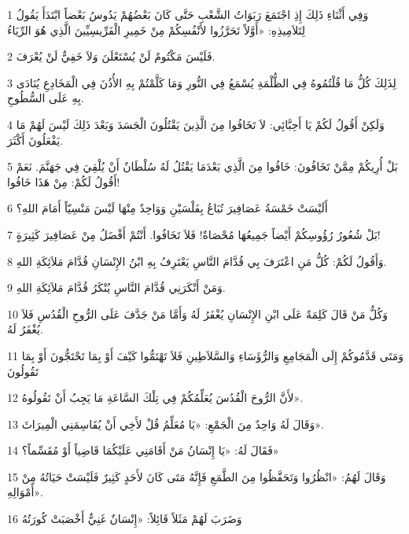 \par 1 وَفِي أَثْنَاءِ ذَلِكَ إِذِ اجْتَمَعَ رَبَوَاتُ الشَّعْبِ حَتَّى كَانَ بَعْضُهُمْ يَدُوسُ بَعْضاً ابْتَدَأَ يَقُولُ لِتَلاَمِيذِهِ: «أَوَّلاً تَحَرَّزُوا لأَنْفُسِكُمْ مِنْ خَمِيرِ الْفَرِّيسِيِّينَ الَّذِي هُوَ الرِّيَاءُ
\par 2 فَلَيْسَ مَكْتُومٌ لَنْ يُسْتَعْلَنَ وَلاَ خَفِيٌّ لَنْ يُعْرَفَ.
\par 3 لِذَلِكَ كُلُّ مَا قُلْتُمُوهُ فِي الظُّلْمَةِ يُسْمَعُ فِي النُّورِ وَمَا كَلَّمْتُمْ بِهِ الأُذُنَ فِي الْمَخَادِعِ يُنَادَى بِهِ عَلَى السُّطُوحِ.
\par 4 وَلَكِنْ أَقُولُ لَكُمْ يَا أَحِبَّائِي: لاَ تَخَافُوا مِنَ الَّذِينَ يَقْتُلُونَ الْجَسَدَ وَبَعْدَ ذَلِكَ لَيْسَ لَهُمْ مَا يَفْعَلُونَ أَكْثَرَ.
\par 5 بَلْ أُرِيكُمْ مِمَّنْ تَخَافُونَ: خَافُوا مِنَ الَّذِي بَعْدَمَا يَقْتُلُ لَهُ سُلْطَانٌ أَنْ يُلْقِيَ فِي جَهَنَّمَ. نَعَمْ أَقُولُ لَكُمْ: مِنْ هَذَا خَافُوا!
\par 6 أَلَيْسَتْ خَمْسَةُ عَصَافِيرَ تُبَاعُ بِفَلْسَيْنِ وَوَاحِدٌ مِنْهَا لَيْسَ مَنْسِيّاً أَمَامَ اللهِ؟
\par 7 بَلْ شُعُورُ رُؤُوسِكُمْ أَيْضاً جَمِيعُهَا مُحْصَاةٌ! فَلاَ تَخَافُوا. أَنْتُمْ أَفْضَلُ مِنْ عَصَافِيرَ كَثِيرَةٍ!
\par 8 وَأَقُولُ لَكُمْ: كُلُّ مَنِ اعْتَرَفَ بِي قُدَّامَ النَّاسِ يَعْتَرِفُ بِهِ ابْنُ الإِنْسَانِ قُدَّامَ مَلاَئِكَةِ اللهِ.
\par 9 وَمَنْ أَنْكَرَنِي قُدَّامَ النَّاسِ يُنْكَرُ قُدَّامَ مَلاَئِكَةِ اللهِ.
\par 10 وَكُلُّ مَنْ قَالَ كَلِمَةً عَلَى ابْنِ الإِنْسَانِ يُغْفَرُ لَهُ وَأَمَّا مَنْ جَدَّفَ عَلَى الرُّوحِ الْقُدُسِ فَلاَ يُغْفَرُ لَهُ.
\par 11 وَمَتَى قَدَّمُوكُمْ إِلَى الْمَجَامِعِ وَالرُّؤَسَاءِ وَالسَّلاَطِينِ فَلاَ تَهْتَمُّوا كَيْفَ أَوْ بِمَا تَحْتَجُّونَ أَوْ بِمَا تَقُولُونَ
\par 12 لأَنَّ الرُّوحَ الْقُدُسَ يُعَلِّمُكُمْ فِي تِلْكَ السَّاعَةِ مَا يَجِبُ أَنْ تَقُولُوهُ».
\par 13 وَقَالَ لَهُ وَاحِدٌ مِنَ الْجَمْعِ: «يَا مُعَلِّمُ قُلْ لأَخِي أَنْ يُقَاسِمَنِي الْمِيرَاثَ».
\par 14 فَقَالَ لَهُ: «يَا إِنْسَانُ مَنْ أَقَامَنِي عَلَيْكُمَا قَاضِياً أَوْ مُقَسِّماً؟»
\par 15 وَقَالَ لَهُمُ: «انْظُرُوا وَتَحَفَّظُوا مِنَ الطَّمَعِ فَإِنَّهُ مَتَى كَانَ لأَحَدٍ كَثِيرٌ فَلَيْسَتْ حَيَاتُهُ مِنْ أَمْوَالِهِ».
\par 16 وَضَرَبَ لَهُمْ مَثَلاً قَائِلاً: «إِنْسَانٌ غَنِيٌّ أَخْصَبَتْ كُورَتُهُ
